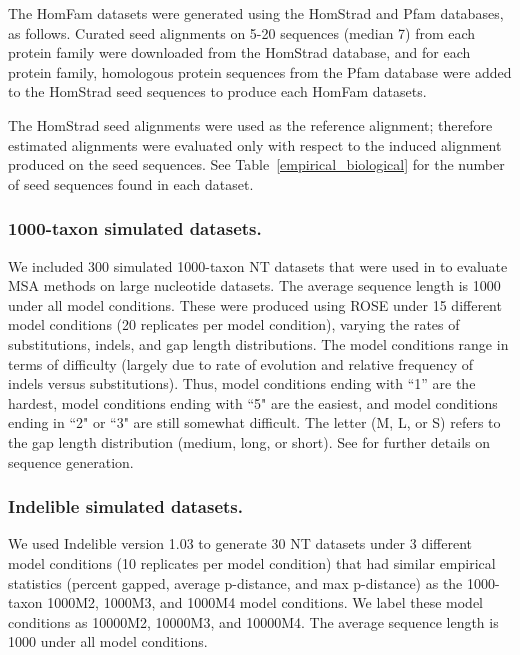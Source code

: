 The HomFam datasets were generated using the HomStrad \cite{Stebbings2004} and Pfam \cite{Punta2012} databases, as follows.
Curated seed alignments on 5-20 sequences (median 7) from each protein family 
were downloaded from the HomStrad database, and
for each protein family, homologous protein sequences from the Pfam database were 
added to the HomStrad seed sequences to produce each HomFam datasets.  

The HomStrad seed alignments were used as the reference alignment; therefore estimated alignments
were evaluated only with respect to the induced alignment produced on the seed sequences.  See Table~\ref{empirical_biological} for the number of seed sequences found in each dataset.  

\subsubsection{1000-taxon simulated datasets.}  
We included 300 simulated 1000-taxon NT datasets that were
used in \cite{Liu2009,Liu2012} to evaluate MSA methods on large
nucleotide datasets.
The average  sequence length is 1000 under all model conditions.
These were produced using ROSE under 15 different model conditions (20 replicates per model condition), 
varying the rates of substitutions, indels, and gap length distributions.  
The model conditions range in terms of difficulty (largely due to rate of evolution and
relative frequency of indels versus substitutions). Thus, 
model conditions ending with ``1'' are the hardest, model conditions ending with ``5"
are the easiest, and model conditions ending in ``2" or ``3" are still somewhat difficult.
The letter (M, L, or S) refers to the gap length distribution (medium, long, or short).
See \cite{Liu2009} for further details on sequence generation.  


\subsubsection{Indelible simulated datasets.}
We used Indelible \cite{Fletcher01082009} version 1.03 to generate 30 NT datasets under 3 different model conditions (10 replicates per model condition) that had similar empirical statistics (percent gapped, average p-distance, and max p-distance) as the 1000-taxon 1000M2, 1000M3, and 1000M4 model conditions.  We label these model conditions as 10000M2, 10000M3, and 10000M4.  
The average  sequence length is 1000 under all model conditions.

